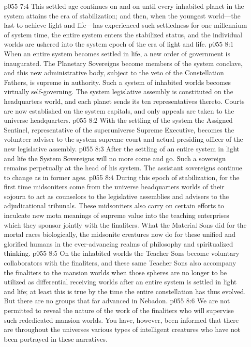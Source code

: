 \pc \vs p055 7:4 This settled age continues on and on until every inhabited planet in the system attains the era of stabilization; and then, when the youngest world---the last to achieve light and life---has experienced such settledness for one millennium of system time, the entire system enters the stabilized status, and the individual worlds are ushered into the system epoch of the era of light and life.
\vs p055 8:1 When an entire system becomes settled in life, a new order of government is inaugurated. The Planetary Sovereigns become members of the system conclave, and this new administrative body, subject to the veto of the Constellation Fathers, is supreme in authority. Such a system of inhabited worlds becomes virtually self\hyp{}governing. The system legislative assembly is constituted on the headquarters world, and each planet sends its ten representatives thereto. Courts are now established on the system capitals, and only appeals are taken to the universe headquarters.
\vs p055 8:2 With the settling of the system the Assigned Sentinel, representative of the superuniverse Supreme Executive, becomes the volunteer adviser to the system supreme court and actual presiding officer of the new legislative assembly.
\vs p055 8:3 After the settling of an entire system in light and life the System Sovereigns will no more come and go. Such a sovereign remains perpetually at the head of his system. The assistant sovereigns continue to change as in former ages.
\vs p055 8:4 During this epoch of stabilization, for the first time midsoniters come from the universe headquarters worlds of their sojourn to act as counselors to the legislative assemblies and advisers to the adjudicational tribunals. These midsoniters also carry on certain efforts to inculcate new mota meanings of supreme value into the teaching enterprises which they sponsor jointly with the finaliters. What the Material Sons did for the mortal races biologically, the midsonite creatures now do for these unified and glorified humans in the ever\hyp{}advancing realms of philosophy and spiritualized thinking.
\pc \vs p055 8:5 On the inhabited worlds the Teacher Sons become voluntary collaborators with the finaliters, and these same Teacher Sons also accompany the finaliters to the mansion worlds when those spheres are no longer to be utilized as differential receiving worlds after an entire system is settled in light and life; at least this is true by the time the entire constellation has thus evolved. But there are no groups that far advanced in Nebadon.
\vs p055 8:6 We are not permitted to reveal the nature of the work of the finaliters who will supervise such rededicated mansion worlds. You have, however, been informed that there are throughout the universes various types of intelligent creatures who have not been portrayed in these narratives.
